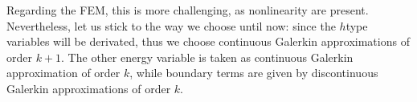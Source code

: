 \documentclass[letterpaper,10pt,english]{sphinxmanual}
\begin{document}
\begin{sphinxVerbatim}[commandchars=\\\{\}]
\PYG{p}{]}

   
\end{sphinxVerbatim}

\sphinxAtStartPar
Regarding the FEM, this is more challenging, as non\sphinxhyphen{}linearity are
present. Nevertheless, let us stick to the way we choose until now:
since the \(h\)\sphinxhyphen{}type variables will be derivated, thus we choose
continuous Galerkin approximations of order \(k+1\). The other energy variable is taken as continuous Galerkin approximation of order \(k\), while boundary terms are given by discontinuous Galerkin approximations of order
\(k\).
\end{document}
